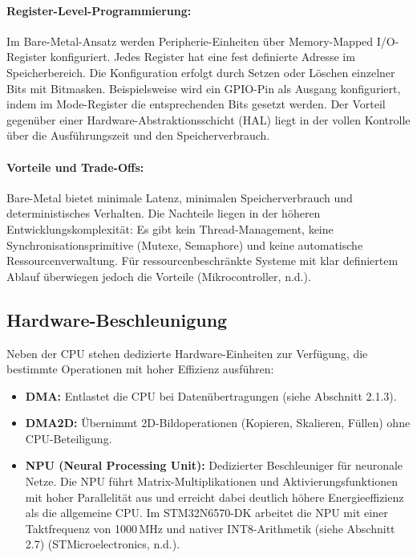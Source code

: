 \paragraph{Register-Level-Programmierung:}
Im Bare-Metal-Ansatz werden Peripherie-Einheiten über Memory-Mapped I/O-Register konfiguriert. Jedes Register hat eine fest definierte Adresse im Speicherbereich. Die Konfiguration erfolgt durch Setzen oder Löschen einzelner Bits mit Bitmasken. Beispielsweise wird ein GPIO-Pin als Ausgang konfiguriert, indem im Mode-Register die entsprechenden Bits gesetzt werden. Der Vorteil gegenüber einer Hardware-Abstraktionsschicht (HAL) liegt in der vollen Kontrolle über die Ausführungszeit und den Speicherverbrauch.

\paragraph{Vorteile und Trade-Offs:}
Bare-Metal bietet minimale Latenz, minimalen Speicherverbrauch und deterministisches Verhalten. Die Nachteile liegen in der höheren Entwicklungskomplexität: Es gibt kein Thread-Management, keine Synchronisationsprimitive (Mutexe, Semaphore) und keine automatische Ressourcenverwaltung. Für ressourcenbeschränkte Systeme mit klar definiertem Ablauf überwiegen jedoch die Vorteile (Mikrocontroller, n.d.).

\subsection{Hardware-Beschleunigung}

Neben der CPU stehen dedizierte Hardware-Einheiten zur Verfügung, die bestimmte Operationen mit hoher Effizienz ausführen:

\begin{itemize}
    \item \textbf{DMA:} Entlastet die CPU bei Datenübertragungen (siehe Abschnitt 2.1.3).
    \item \textbf{DMA2D:} Übernimmt 2D-Bildoperationen (Kopieren, Skalieren, Füllen) ohne CPU-Beteiligung.
    \item \textbf{NPU (Neural Processing Unit):} Dedizierter Beschleuniger für neuronale Netze. Die NPU führt Matrix-Multiplikationen und Aktivierungsfunktionen mit hoher Parallelität aus und erreicht dabei deutlich höhere Energieeffizienz als die allgemeine CPU. Im STM32N6570-DK arbeitet die NPU mit einer Taktfrequenz von 1000\,MHz und nativer INT8-Arithmetik (siehe Abschnitt 2.7) (STMicroelectronics, n.d.).
\end{itemize}

